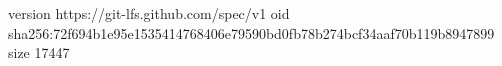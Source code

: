 version https://git-lfs.github.com/spec/v1
oid sha256:72f694b1e95e1535414768406e79590bd0fb78b274bcf34aaf70b119b8947899
size 17447
